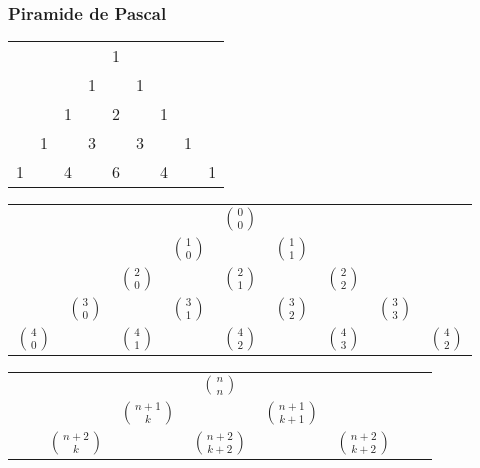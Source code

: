 			\subsubsection{Piramide de Pascal}
			\begin{table}[H]
				\centering
				\begin{tabular}{ccccccccc}
					&   &   &   & 1 &   &   &   &   \\  
					&   &   & 1 &   & 1 &   &   &   \\
					&   & 1 &   & 2 &   & 1 &   &   \\  
					& 1 &   & 3 &   & 3 &   & 1 &   \\
					1 &   & 4 &   & 6 &   & 4 &   & 1 \\
				\end{tabular}
			\end{table}
			\begin{table}[H]
				\centering
				\begin{tabular}{ccccccccc}
					&   &   &   & $\binom{0}{0}$ &   &   &   &   \\  
					&   &   & $\binom{1}{0}$ &   & $\binom{1}{1}$ &   &   &   \\
					&   & $\binom{2}{0}$ &   & $\binom{2}{1}$ &   & $\binom{2}{2}$ &   &   \\  
					& $\binom{3}{0}$ &   & $\binom{3}{1}$ &   & $\binom{3}{2}$ &   & $\binom{3}{3}$ &   \\
					$\binom{4}{0}$ &   & $\binom{4}{1}$ &   & $\binom{4}{2}$ &   & $\binom{4}{3}$ &   & $\binom{4}{2}$ \\
				\end{tabular}
			\end{table}
			\begin{table}[H]
				\centering
				\begin{tabular}{ccccccccc}
					&   &   &   & $\binom{n}{n}$ &   &   &   &   \\  
					&   &   & $\binom{n+1}{k}$ &   & $\binom{n+1}{k+1}$ &   &   &   \\
					&   & $\binom{n+2}{k}$ &   & $\binom{n+2}{k+2}$ &   & $\binom{n+2}{k+2}$ &   &   \\
				\end{tabular}
			\end{table}
